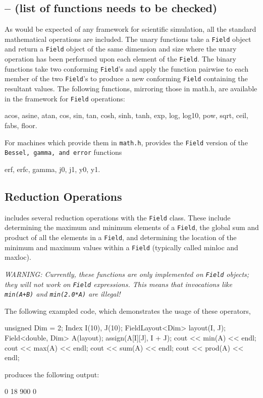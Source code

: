 \subsection{ -- (list of functions needs to be checked)}

As would be expected of any framework for scientific simulation, all the standard mathematical operations are included. The unary functions take a \texttt{Field} object and return a \texttt{Field} object of the same dimension and size where the unary operation has been performed upon each element of the \texttt{Field}. The binary functions take two conforming \texttt{Field}'s and apply the function pairwise to each member of the two \texttt{Field}'s to produce a new conforming \texttt{Field} containing the resultant values. The following
functions, mirroring those in math.h, are available in the framework for \texttt{Field} operations:
\begin{smallcode}
acos, asine, atan, cos, sin, tan, cosh, sinh, tanh,
exp, log, log10, pow, sqrt, ceil, fabs, floor.
\end{smallcode}
For machines which provide them in \texttt{math.h}, \ippl provides the \texttt{Field} version of the \texttt{Bessel, gamma, and error} functions
\begin{smallcode}
erf, erfc, gamma, j0, j1, y0, y1.
\end{smallcode}

\subsection{Reduction Operations}

\ippl includes several reduction operations with the \texttt{Field} class. These include determining the maximum and minimum elements of a \texttt{Field}, the global sum and product of all the elements in a \texttt{Field}, and determining the location of the minimum and maximum values within a \texttt{Field} (typically called minloc and maxloc).

\textit{WARNING: Currently, these functions are only implemented on \texttt{Field} objects; they will not work on \texttt{Field} expressions. This means that invocations like \texttt{min(A+B)} and \texttt{min(2.0*A)} are illegal!}

The following exampled code, which demonstrates the usage of these operators,\\
\begin{code}
unsigned Dim = 2;
Index I(10), J(10);
FieldLayout<Dim> layout(I, J);
Field<double, Dim> A(layout);
assign(A[I][J], I + J);
cout << min(A) << endl;
cout << max(A) << endl;
cout << sum(A) << endl;
cout << prod(A) << endl;
\end{code}
produces the following output:
\begin{smallcode}
0
18
900
0
\end{smallcode}


